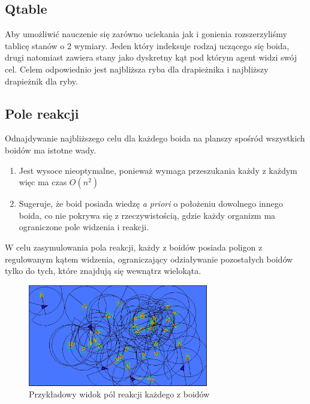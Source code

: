 \documentclass{article}
\begin{document}
\subsection{Qtable}
Aby umożliwić nauczenie się zarówno uciekania jak i gonienia rozszerzyliśmy tablicę stanów o 2 wymiary. Jeden który indeksuje rodzaj uczącego się boida, drugi natomiast zawiera stany jako dyskretny kąt pod którym agent widzi swój cel. Celem odpowiednio jest najbliższa ryba dla drapieżnika i najbliższy drapieżnik dla ryby.
\subsection{Pole reakcji}
Odnajdywanie najbliższego celu dla każdego boida na planszy spośród wszystkich boidów ma istotne wady.
\begin{enumerate}
    \item Jest wysoce nieoptymalne, ponieważ wymaga przeszukania każdy z każdym więc ma czas \(O(n^2)\)
    \item Sugeruje, że boid posiada wiedzę \textit{a priori} o położeniu dowolnego innego boida, co nie pokrywa się z rzeczywistością, gdzie każdy organizm ma ograniczone pole widzenia i reakcji.
\end{enumerate}
W celu zasymulowania pola reakcji, każdy z boidów posiada poligon z regulowanym kątem widzenia, ograniczający odziaływanie pozostałych boidów tylko do tych, które znajdują się wewnątrz wielokąta.
\begin{figure}[h]
    \centering
    \includegraphics[width=0.7\textwidth]{12_hunting_debug.jpg}
    \caption{Przykładowy widok pól reakcji każdego z boidów}
\end{figure}
\end{document}
